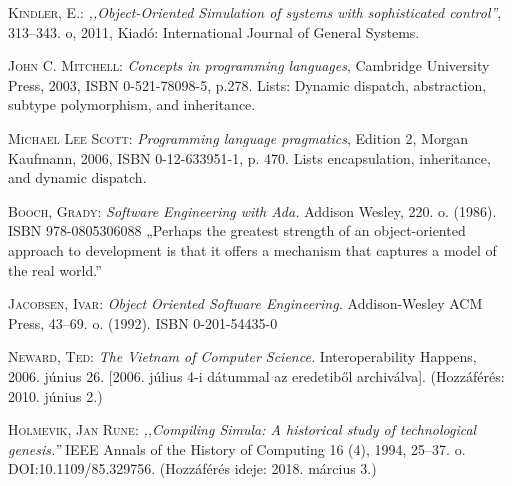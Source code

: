 \documentclass[a4paper,12pt,twoside]{report}
\theoremstyle{definition}
\begin{document}
	\begin{thebibliography}{1}
		 \textsc{Kindler, E.:} \emph{,,Object-Oriented Simulation of systems with sophisticated control''}, 313–343. o, 2011, Kiadó: International Journal of General Systems.
		
		 \textsc{John C. Mitchell:} \emph{Concepts in programming languages}, Cambridge University Press, 2003, ISBN 0-521-78098-5, p.278. Lists: Dynamic dispatch, abstraction, subtype polymorphism, and inheritance.
		
		 \textsc{Michael Lee Scott:} \emph{Programming language pragmatics}, Edition 2, Morgan Kaufmann, 2006, ISBN 0-12-633951-1, p. 470. Lists encapsulation, inheritance, and dynamic dispatch.
		
		 \textsc{Booch, Grady:} \emph{Software Engineering with Ada.} Addison Wesley, 220. o. (1986). ISBN 978-0805306088 „Perhaps the greatest strength of an object-oriented approach to development is that it offers a mechanism that captures a model of the real world.”
		
		 \textsc{Jacobsen, Ivar:} \emph{Object Oriented Software Engineering.} Addison-Wesley ACM Press, 43–69. o. (1992). ISBN 0-201-54435-0
				
		 \textsc{Neward, Ted:} \emph{The Vietnam of Computer Science.} Interoperability Happens, 2006. június 26. [2006. július 4-i dátummal az eredetiből archiválva]. (Hozzáférés: 2010. június 2.)
		
		 \textsc{Holmevik, Jan Rune:} \emph{,,Compiling Simula: A historical study of technological genesis.''} IEEE Annals of the History of Computing 16 (4), 1994, 25–37. o. DOI:10.1109/85.329756. (Hozzáférés ideje: 2018. március 3.)
	\end{thebibliography}
\end{document}
